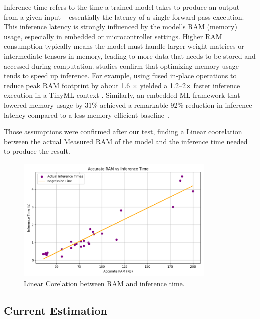 Inference time refers to the time a trained model takes to produce an output from a given input – essentially the latency of a single forward-pass execution. This inference latency is strongly influenced by the model’s RAM (memory) usage, especially in embedded or microcontroller settings. Higher RAM consumption typically means the model must handle larger weight matrices or intermediate tensors in memory, leading to more data that needs to be stored and accessed during computation.
studies confirm that optimizing memory usage tends to speed up inference. For example, using fused in-place operations to reduce peak RAM footprint by about 1.6 × yielded a 1.2–2× faster inference execution in a TinyML context \cite{inferenceTime1}. Similarly, an embedded ML framework that lowered memory usage by 31\% achieved a remarkable 92\% reduction in inference latency compared to a less memory-efficient baseline~\cite{inferenceTime1}.


Those assumptions were confirmed after our test, finding a Linear coorelation between the actual Measured RAM of the model and the inference time needed to produce the result.

\begin{figure}[ht]
  \centering
  \includegraphics[width=0.85\textwidth]{Pictures/inference_time_regression_plot.png}
  \caption{Linear Corelation between RAM and inference time.}
  \label{fig:inference time}
\end{figure}

\clearpage


\subsection{Current Estimation}



